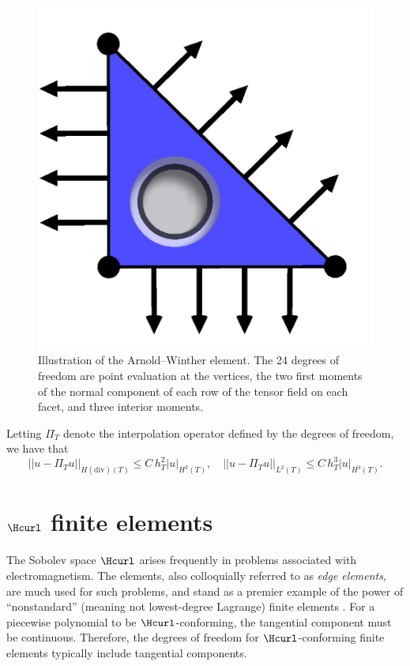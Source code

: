 \begin{figure}
  \centering
  \includegraphics[width=\smallfig]{chapters/kirby-6/png/AW_2d.png}
  \caption{Illustration of the Arnold--Winther element. The
    24 degrees of freedom are point evaluation at the vertices,
    the two first moments of the normal component of each row of
    the tensor field on each facet, and three interior moments.}
\end{figure}

Letting $\Pi_T$ denote the interpolation operator defined by the
degrees of freedom, we have that
\begin{equation}
  ||u - \Pi_T u||_{H(\mathrm{div})(T)} \leqslant C \, h_T^2 |u|_{H^{3}(T)}, \quad
  ||u - \Pi_T u||_{L^2(T)} \leqslant C \, h_T^{3} |u|_{H^3(T)}.
\end{equation}

\section{$\Hcurl$ finite elements}

The Sobolev space $\Hcurl$ arises frequently in problems associated
with electromagnetism. The \nedelec{} elements, also colloquially
referred to as \emph{edge elements}, are much used for such problems,
and stand as a premier example of the power of ``nonstandard''
(meaning not lowest-degree Lagrange) finite elements
\citep{Nedelec1980,Nedelec1986}. For a piecewise polynomial to be
$\Hcurl$-conforming, the tangential component must be
continuous. Therefore, the degrees of freedom for $\Hcurl$-conforming
finite elements typically include tangential components.

